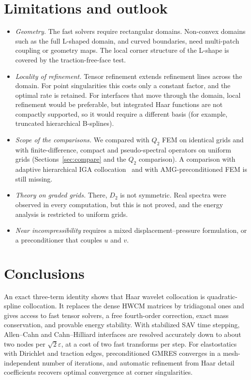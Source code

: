 \documentclass[preprint,12pt]{elsarticle}
\theoremstyle{remark}
\begin{document}
\section{Limitations and outlook}\label{sec:limits}
\begin{itemize}
\item \emph{Geometry.} The fast solvers require rectangular domains. Non-convex domains such as the full
L-shaped domain, and curved boundaries, need multi-patch coupling or geometry maps. The local corner
structure of the L-shape is covered by the traction-free-face test.
\item \emph{Locality of refinement.} Tensor refinement extends refinement lines across the domain. For
point singularities this costs only a constant factor, and the optimal rate is retained. For interfaces
that move through the domain, local refinement would be preferable, but integrated Haar functions are
not compactly supported, so it would require a different basis (for example, truncated hierarchical
B-splines).
\item \emph{Scope of the comparisons.} We compared with $Q_2$ FEM on identical grids and with
finite-difference, compact and pseudo-spectral operators on uniform grids
(Sections~\ref{sec:compare} and the $Q_2$ comparison). A comparison with adaptive hierarchical IGA
collocation~\cite{schillinger2013isogeometric} and with AMG-preconditioned FEM is still missing.
\item \emph{Theory on graded grids.} There, $D_2$ is not symmetric. Real spectra were observed in every
computation, but this is not proved, and the energy analysis is restricted to uniform grids.
\item \emph{Near incompressibility} requires a mixed displacement--pressure formulation, or a
preconditioner that couples $u$ and $v$.
\end{itemize}

\section{Conclusions}
An exact three-term identity shows that Haar wavelet collocation is quadratic-spline collocation. It
replaces the dense HWCM matrices by tridiagonal ones and gives access to fast tensor solvers, a free
fourth-order correction, exact mass conservation, and provable energy stability. With stabilized SAV
time stepping, Allen--Cahn and Cahn--Hilliard interfaces are resolved accurately down to about two
nodes per $\sqrt2\varepsilon$, at a cost of two fast transforms per step. For elastostatics with Dirichlet
and traction edges, preconditioned GMRES converges in a mesh-independent number of iterations, and
automatic refinement from Haar detail coefficients recovers optimal convergence at corner singularities.
\end{document}
